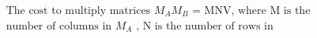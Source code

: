 \documentclass[preview]{standalone}
\begin{document}
\begin{align*}
\text{The cost to multiply matrices } M_{A} M_{B} \text{ = MNV, where M is the} \\\text{number of columns in } M_{A} \text{ , N is the number of rows in}
\end{align*}
\end{document}
